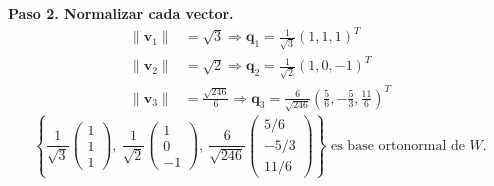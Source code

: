 \begin{example}
\begin{myproof}
\textbf{Paso 2. Normalizar cada vector.}
\begin{align*}
\|\mathbf{v}_1\| &= \sqrt{3} \Rightarrow \mathbf{q}_1 = \tfrac{1}{\sqrt{3}} (1,1,1)^T \\
\|\mathbf{v}_2\| &= \sqrt{2} \Rightarrow \mathbf{q}_2 = \tfrac{1}{\sqrt{2}} (1,0,-1)^T \\
\|\mathbf{v}_3\| &= \tfrac{\sqrt{246}}{6} \Rightarrow \mathbf{q}_3 = \tfrac{6}{\sqrt{246}} \left(\tfrac{5}{6}, -\tfrac{5}{3}, \tfrac{11}{6}\right)^T
\end{align*}
$$\boxed{\left\{ \frac{1}{\sqrt{3}}\begin{pmatrix}1\\1\\1\end{pmatrix},\ \frac{1}{\sqrt{2}}\begin{pmatrix}1\\0\\-1\end{pmatrix},\ \frac{6}{\sqrt{246}}\begin{pmatrix}5/6\\-5/3\\11/6\end{pmatrix} \right\} \text{ es base ortonormal de } W.}$$
\end{myproof}
\end{example}


